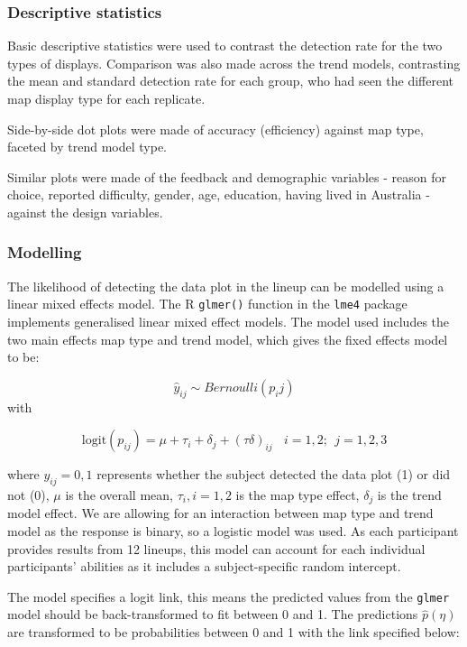 \documentclass[
doublespace,
  times]{anzsauth}
\begin{document}
\subsubsection{Descriptive statistics}\label{descriptive-statistics}

Basic descriptive statistics were used to contrast the detection rate
for the two types of displays. Comparison was also made across the trend
models, contrasting the mean and standard detection rate for each group,
who had seen the different map display type for each replicate.

Side-by-side dot plots were made of accuracy (efficiency) against map
type, faceted by trend model type.

Similar plots were made of the feedback and demographic variables -
reason for choice, reported difficulty, gender, age, education, having
lived in Australia - against the design variables.

\subsubsection{Modelling}\label{modelling}

The likelihood of detecting the data plot in the lineup can be modelled
using a linear mixed effects model. The R \texttt{glmer()} function in
the \texttt{lme4} \citep{lme4} package implements generalised linear
mixed effect models. The model used includes the two main effects map
type and trend model, which gives the fixed effects model to be:

\[
\hat{y}_{ij} \sim Bernoulli(p_ij)
\] with

\[
\text{logit}(p_{ij}) = \mu + \tau_i + \delta_j + (\tau \delta)_{ij} ~~~~ i=1,2; ~~ j=1,2,3
\]

where \(y_{ij} = 0, 1\) represents whether the subject detected the data
plot (1) or did not (0), \(\mu\) is the overall mean, \(\tau_i, i=1,2\)
is the map type effect, \(\delta_j\) is the trend model effect. We are
allowing for an interaction between map type and trend model as the
response is binary, so a logistic model was used. As each participant
provides results from 12 lineups, this model can account for each
individual participants' abilities as it includes a subject-specific
random intercept.

The model specifies a logit link, this means the predicted values from
the \texttt{glmer} model should be back-transformed to fit between 0 and
1. The predictions \(\widehat{p}(\eta)\) are transformed to be
probabilities between 0 and 1 with the link specified below:
\end{document}
